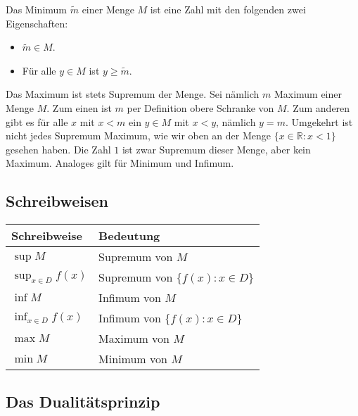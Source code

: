 \documentclass[fontsize=9pt,
               parskip=half-,
               DIV=14,
               listof=chapterentry,
               tocflat]{scrbook}
\begin{document}
\begin{definition*}[Minimum]
Das Minimum ${\tilde {m}}$ einer Menge $M$ ist eine Zahl mit den folgenden zwei Eigenschaften:

\begin{itemize}
\item ${\tilde {m}}\in M$.
\item Für alle $y\in M$ ist $y\geq {\tilde {m}}$.
\end{itemize}

\end{definition*}

Das Maximum ist stets Supremum der Menge. Sei nämlich $m$ Maximum einer Menge $M$. Zum einen ist $m$ per Definition obere Schranke von $M$. Zum anderen gibt es für alle $x$ mit $x<m$ ein $y\in M$ mit $x<y$, nämlich $y=m$. Umgekehrt ist nicht jedes Supremum Maximum, wie wir oben an der Menge $\{x\in \mathbb {R} :x<1\}$ gesehen haben. Die Zahl $1$ ist zwar Supremum dieser Menge, aber kein Maximum. Analoges gilt für Minimum und Infimum.

\subsection{Schreibweisen}


\renewcommand{\arraystretch}{1.5}

\begin{longtabu} to \linewidth {X[l]X[l]} \\ \toprule 
Schreibweise & Bedeutung \\ 
\midrule
$\sup M$ & Supremum von $M$ \\ 
$\sup _{x\in D}f(x)$ & Supremum von $\{f(x):x\in D\}$ \\ 
$\inf M$ & Infimum von $M$ \\ 
$\inf _{x\in D}f(x)$ & Infimum von $\{f(x):x\in D\}$ \\ 
$\max M$ & Maximum von $M$ \\ 
$\min M$ & Minimum von $M$ \\ 
\bottomrule
\end{longtabu}
\renewcommand{\arraystretch}{1.0}
\subsection{Das Dualitätsprinzip}
\end{document}
